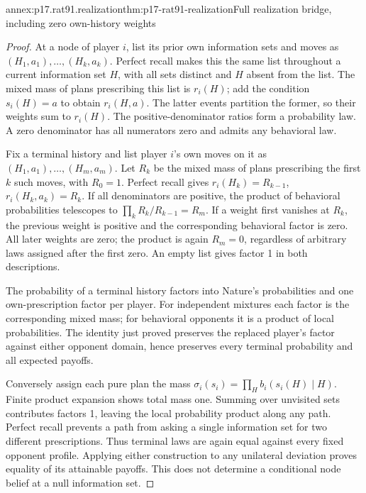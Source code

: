 \begin{annexitem}{annex:p17.rat91.realization}{thm:p17-rat91-realization}{Full realization bridge, including zero own-history weights}
\begin{proof}
At a node of player \(i\), list its prior own information sets
and moves as \((H_1,a_1),\ldots,(H_k,a_k)\). Perfect recall
makes this the same list throughout a current information set
\(H\), with all sets distinct and \(H\) absent from the list.
The mixed mass of plans prescribing this list is \(r_i(H)\);
add the condition \(s_i(H)=a\) to obtain \(r_i(H,a)\).
The latter events partition the former, so their weights sum
to \(r_i(H)\). The positive-denominator ratios form a probability
law. A zero denominator has all numerators zero and admits any
behavioral law.

Fix a terminal history and list player \(i\)'s own moves on it
as \((H_1,a_1),\ldots,(H_m,a_m)\). Let \(R_k\) be
the mixed mass of plans prescribing the first \(k\) such moves,
with \(R_0=1\). Perfect recall gives
\(r_i(H_k)=R_{k-1}\), \(r_i(H_k,a_k)=R_k\).
If all denominators are positive, the product of behavioral
probabilities telescopes to \(\prod_kR_k/R_{k-1}=R_m\).
If a weight first vanishes at \(R_k\), the previous weight
is positive and the corresponding behavioral factor is zero.
All later weights are zero; the product is again \(R_m=0\),
regardless of arbitrary laws assigned after the first zero.
An empty list gives factor 1 in both descriptions.

The probability of a terminal history factors into Nature's
probabilities and one own-prescription factor per player. For
independent mixtures each factor is the corresponding mixed
mass; for behavioral opponents it is a product of local
probabilities. The identity just proved preserves the replaced
player's factor against either opponent domain, hence preserves
every terminal probability and all expected payoffs.

Conversely assign each pure plan the mass
\(\sigma_i(s_i)=\prod_H b_i(s_i(H)\mid H)\).
Finite product expansion shows total mass one. Summing over
unvisited sets contributes factors 1, leaving the local probability
product along any path. Perfect recall prevents a path from
asking a single information set for two different prescriptions.
Thus terminal laws are again equal against every fixed opponent
profile. Applying either construction to any unilateral deviation
proves equality of its attainable payoffs. This does not determine
a conditional node belief at a null information set.
\end{proof}
\end{annexitem}


